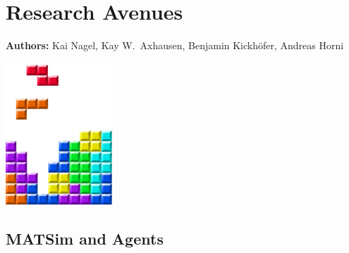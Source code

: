 \chapter{Research Avenues}
\label{ch:researchavenues}

\hfill \textbf{Authors:} Kai Nagel, Kay W.\ Axhausen, Benjamin Kickhöfer, Andreas Horni

\begin{center} \includegraphics[width=0.3\textwidth, angle=0]{frontmatter/figures/MATSimBook} \end{center}

\section{MATSim and Agents}

%
%







